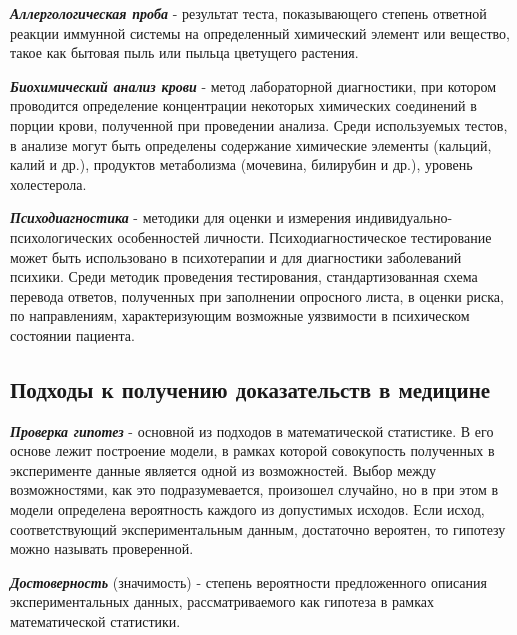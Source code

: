 \noindent
\textbf{ \textit{Аллергологическая проба} } - результат теста, показывающего степень ответной реакции иммунной системы на определенный химический элемент или вещество, такое как бытовая пыль или пыльца цветущего растения.

\noindent
\textbf{ \textit{Биохимический анализ крови} } - метод лабораторной диагностики, при котором проводится определение концентрации некоторых химических соединений в порции крови, полученной при проведении анализа. Среди используемых тестов, в анализе могут быть определены содержание химические элементы (кальций, калий и др.), продуктов метаболизма (мочевина, билирубин и др.), уровень холестерола.

\noindent
\textbf{ \textit{Психодиагностика} } - методики для оценки и измерения индивидуально-психологических особенностей личности. Психодиагностическое тестирование может быть использовано в психотерапии и для диагностики заболеваний психики. Среди методик проведения тестирования, стандартизованная схема перевода ответов, полученных при заполнении опросного листа, в оценки риска, по направлениям, характеризующим возможные уязвимости в психическом состоянии пациента.



\subsection{Подходы к получению доказательств в медицине}

\noindent
\textbf{ \textit{Проверка гипотез} } - основной из подходов в математической статистике. В его основе лежит построение модели, в рамках которой совокупость полученных в эксперименте данные является одной из возможностей. Выбор между возможностями, как это подразумевается, произошел случайно, но в при этом в модели определена вероятность каждого из допустимых исходов. Если исход, соответствующий экспериментальным данным, достаточно вероятен, то гипотезу можно называть проверенной.

\noindent
\textbf{ \textit{Достоверность} } (значимость) - степень вероятности предложенного описания экспериментальных данных, рассматриваемого как гипотеза в рамках математической статистики.

